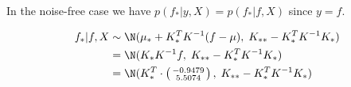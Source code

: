 In the noise-free case we have $p(f_*|y,X) = p(f_*|f,X)$ since $y = f$.

\begin{align*}
 f_*|f,X &\sim \N(\mu_* + K_*^T K^{-1} (f-\mu), \; K_{**} - K_*^T K^{-1} K_*) \\
            &= \N(K_* K^{-1} f, \; K_{**} - K_*^T K^{-1} K_*) \\
	    &= \N(K_*^T \cdot \left(\begin{smallmatrix}-0.9479\\5.5074\end{smallmatrix}\right), \; K_{**} - K_*^T K^{-1} K_*)
\end{align*}

